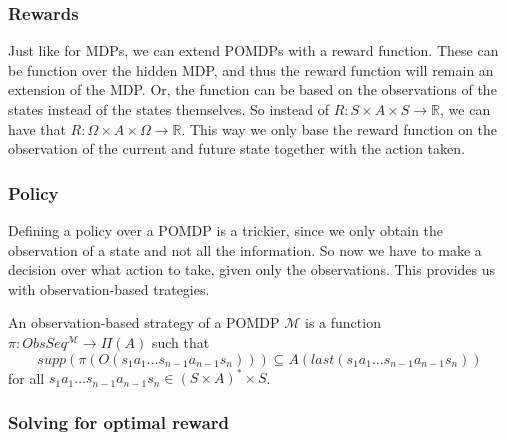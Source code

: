 \subsubsection*{Rewards}
Just like for MDPs, we can extend POMDPs with a reward function. These can be function over the hidden MDP, and thus the reward function will remain an extension of the MDP. Or, the function can be based on the observations of the states instead of the states themselves. So instead of $R:S\times A\times S\to\mathbb{R}$, we can have that $R:\Omega\times A\times\Omega\to\mathbb{R}$. This way we only base the reward function on the observation of the current and future state together with the action taken. 

\subsubsection*{Policy}
Defining a policy over a POMDP is a trickier, since we only obtain the observation of a state and not all the information. So now we have to make a decision over what action to take, given only the observations. This provides us with observation-based trategies. 

\begin{definition}
	An observation-based strategy of a POMDP $\mathcal{M}$ is a function $\pi:ObsSeq^{\mathcal{M}}\to\Pi(A)$ such that 
	\[supp(\pi(O(s_1 a_1 \dots s_{n-1} a_{n-1} s_n)))\subseteq A (last(s_1 a_1 \dots s_{n-1} a_{n-1} s_n))\] for all $s_1 a_1 \dots s_{n-1} a_{n-1} s_n\in(S\times A)^*\times S$.
\end{definition}

\subsubsection*{Solving for optimal reward}
